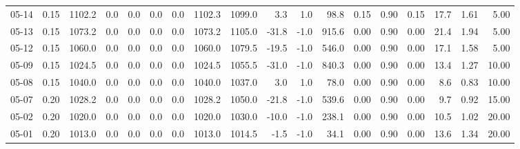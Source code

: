 \begin{threeparttable}
{\begin{tabular}{lrrrrrrrrrrrrrrrrr}
  05-14 &     0.15 & 1102.2 &               0.0 &               0.0 &                0.0 &                0.0 & 1102.3 & 1099.0 &        3.3 &                      1.0 &                98.8 &       0.15 &      0.90 &           0.15 &             17.7 &            1.61 &                   5.00 \\
  05-13 &     0.15 & 1073.2 &               0.0 &               0.0 &                0.0 &                0.0 & 1073.2 & 1105.0 &      -31.8 &                     -1.0 &               915.6 &       0.00 &      0.90 &           0.00 &             21.4 &            1.94 &                   5.00 \\
  05-12 &     0.15 & 1060.0 &               0.0 &               0.0 &                0.0 &                0.0 & 1060.0 & 1079.5 &      -19.5 &                     -1.0 &               546.0 &       0.00 &      0.90 &           0.00 &             17.1 &            1.58 &                   5.00 \\
  05-09 &     0.15 & 1024.5 &               0.0 &               0.0 &                0.0 &                0.0 & 1024.5 & 1055.5 &      -31.0 &                     -1.0 &               840.3 &       0.00 &      0.90 &           0.00 &             13.4 &            1.27 &                  10.00 \\
  05-08 &     0.15 & 1040.0 &               0.0 &               0.0 &                0.0 &                0.0 & 1040.0 & 1037.0 &        3.0 &                      1.0 &                78.0 &       0.00 &      0.90 &           0.00 &              8.6 &            0.83 &                  10.00 \\
  05-07 &     0.20 & 1028.2 &               0.0 &               0.0 &                0.0 &                0.0 & 1028.2 & 1050.0 &      -21.8 &                     -1.0 &               539.6 &       0.00 &      0.90 &           0.00 &              9.7 &            0.92 &                  15.00 \\
  05-02 &     0.20 & 1020.0 &               0.0 &               0.0 &                0.0 &                0.0 & 1020.0 & 1030.0 &      -10.0 &                     -1.0 &               238.1 &       0.00 &      0.90 &           0.00 &             10.5 &            1.02 &                  20.00 \\
  05-01 &     0.20 & 1013.0 &               0.0 &               0.0 &                0.0 &                0.0 & 1013.0 & 1014.5 &       -1.5 &                     -1.0 &                34.1 &       0.00 &      0.90 &           0.00 &             13.6 &            1.34 &                  20.00 \\

\end{tabular}}
\end{threeparttable}
